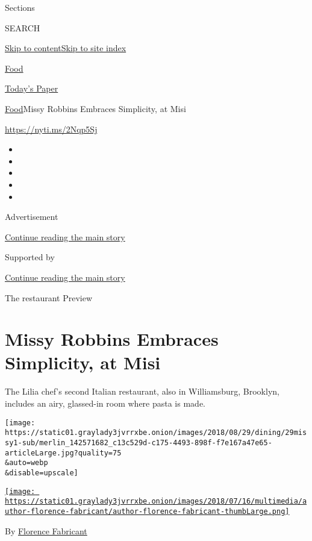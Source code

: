 Sections

SEARCH

\protect\hyperlink{site-content}{Skip to
content}\protect\hyperlink{site-index}{Skip to site index}

\href{https://www.nytimes3xbfgragh.onion/section/food}{Food}

\href{https://myaccount.nytimes3xbfgragh.onion/auth/login?response_type=cookie\&client_id=vi}{}

\href{https://www.nytimes3xbfgragh.onion/section/todayspaper}{Today's
Paper}

\href{/section/food}{Food}\textbar{}Missy Robbins Embraces Simplicity,
at Misi

\url{https://nyti.ms/2Nqp5Sj}

\begin{itemize}
\item
\item
\item
\item
\item
\end{itemize}

Advertisement

\protect\hyperlink{after-top}{Continue reading the main story}

Supported by

\protect\hyperlink{after-sponsor}{Continue reading the main story}

The restaurant Preview

\hypertarget{missy-robbins-embraces-simplicity-at-misi}{%
\section{Missy Robbins Embraces Simplicity, at
Misi}\label{missy-robbins-embraces-simplicity-at-misi}}

The Lilia chef's second Italian restaurant, also in Williamsburg,
Brooklyn, includes an airy, glassed-in room where pasta is made.

\texttt{[image: https://static01.graylady3jvrrxbe.onion/images/2018/08/29/dining/29missy1-sub/merlin\_142571682\_c13c529d-c175-4493-898f-f7e167a47e65-articleLarge.jpg?quality=75\\\&auto=webp\\\&disable=upscale]}

\href{https://www.nytimes3xbfgragh.onion/by/florence-fabricant}{\texttt{[image: https://static01.graylady3jvrrxbe.onion/images/2018/07/16/multimedia/author-florence-fabricant/author-florence-fabricant-thumbLarge.png]}}

By
\href{https://www.nytimes3xbfgragh.onion/by/florence-fabricant}{Florence
Fabricant}

